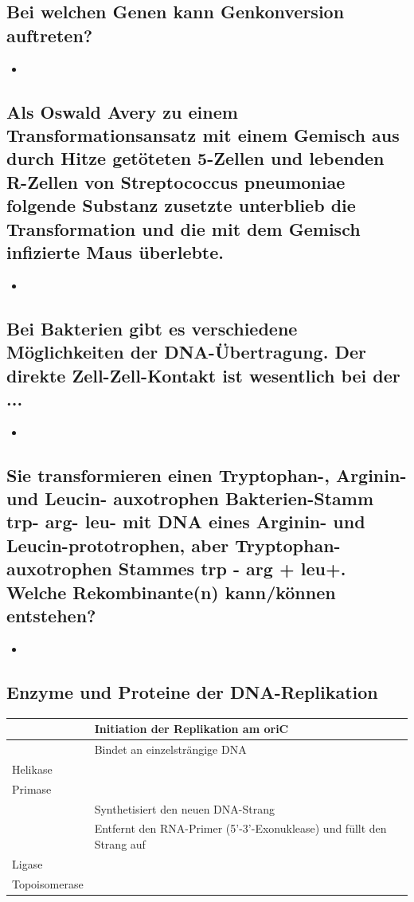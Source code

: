 \documentclass{article}
\begin{document}
\subsection*{Bei welchen Genen kann Genkonversion auftreten?}
\begin{itemize}     \item  \end{itemize}
\subsection*{Als Oswald Avery zu einem Transformationsansatz mit einem Gemisch aus durch Hitze getöteten 5-Zellen und lebenden R-Zellen von Streptococcus pneumoniae folgende Substanz zusetzte unterblieb die Transformation und die mit dem Gemisch infizierte Maus überlebte.
}
\begin{itemize}     \item  \end{itemize}
\subsection*{Bei Bakterien gibt es verschiedene Möglichkeiten der DNA-Übertragung. Der direkte Zell-Zell-Kontakt ist wesentlich bei der ...}
\begin{itemize}     \item  \end{itemize}
\subsection*{Sie transformieren einen Tryptophan-, Arginin- und Leucin- auxotrophen Bakterien-Stamm trp- arg- leu- mit DNA eines Arginin- und Leucin-prototrophen, aber Tryptophan-auxotrophen Stammes trp - arg + leu+. 
Welche Rekombinante(n) kann/können entstehen?}
\begin{itemize}     \item  \end{itemize}

\subsection*{Enzyme und Proteine der DNA-Replikation}
\begin{table}[H]
    \centering 
    \begin{tabular}{|p{4cm}|p{11cm}|}
    \hline
     &  Initiation der Replikation am oriC\\\hline 
     & Bindet an einzelsträngige DNA  \\\hline
    Helikase &  \\\hline
    Primase &   \\\hline
     & Synthetisiert den neuen DNA-Strang \\\hline
     & Entfernt den RNA-Primer (5'-3'-Exonuklease) und füllt den Strang auf \\\hline
    Ligase &  \\\hline
    Topoisomerase &  \\\hline
\end{tabular}
\end{table}
\end{document}
